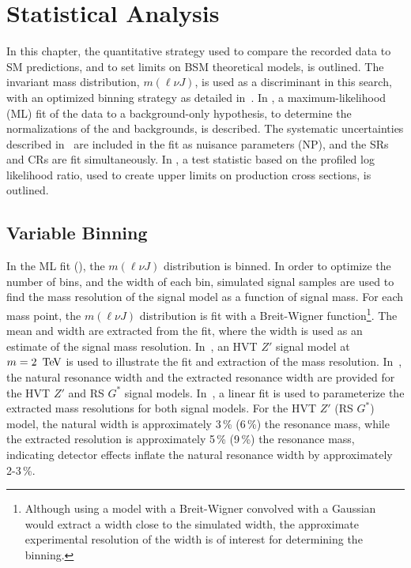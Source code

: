\chapter{Statistical Analysis}
\label{ch:stats}

In this chapter, the quantitative strategy used to compare the recorded data to SM predictions, and to set limits on BSM theoretical models, is outlined. The invariant mass distribution, $m(\ell\nu J)$, is used as a discriminant in this search, with an optimized binning strategy as detailed in~\Sect{\ref{ch:stats:vb}}. In \Sect{\ref{ch:stats:ml}}, a maximum-likelihood (ML) fit of the data to a background-only hypothesis, to determine the normalizations of the \Wjets and \ttbar backgrounds, is described. The systematic uncertainties described in~\Ch{\ref{ch:syst}} are included in the fit as nuisance parameters (NP), and the SRs and CRs are fit simultaneously. In \Sect{\ref{ch:stats:ul}}, a test statistic based on the profiled log likelihood ratio, used to create upper limits on production cross sections, is outlined. 

%
\section{Variable Binning}
\label{ch:stats:vb}
In the ML fit (\Sect{\ref{ch:stats:ml}}), the $m(\ell\nu J)$ distribution is binned. In order to optimize the number of bins, and the width of each bin, simulated signal samples are used to find the mass resolution of the signal model as a function of signal mass.  For each mass point, the $m(\ell\nu J)$ distribution is fit with a Breit-Wigner function\footnote{
	Although using a model with a Breit-Wigner convolved with a Gaussian would extract a width close to the simulated width, the approximate experimental resolution of the width is of interest for determining the binning.
}. The mean and width are extracted from the fit, where the width is used as an estimate of the signal mass resolution. In~\Fig{\ref{fig:sig_fit}}, an HVT $Z'$ signal model at $m=2\,\TeV$ is used to illustrate the fit and extraction of the mass resolution. In~\Tab{\ref{tab:resns}}, the natural resonance width and the extracted resonance width are provided for the HVT $Z'$ and RS $G^*$ signal models. In~\Fig{\ref{fig:binning}}, a linear fit is used to parameterize the extracted mass resolutions for both signal models.  For the HVT $Z'$ (RS $G^{*}$) model, the natural width is approximately 3\,\% (6\,\%) the resonance mass, while the extracted resolution is approximately 5\,\% (9\,\%) the resonance mass, indicating detector effects inflate the natural resonance width by approximately 2-3\,\%. 

